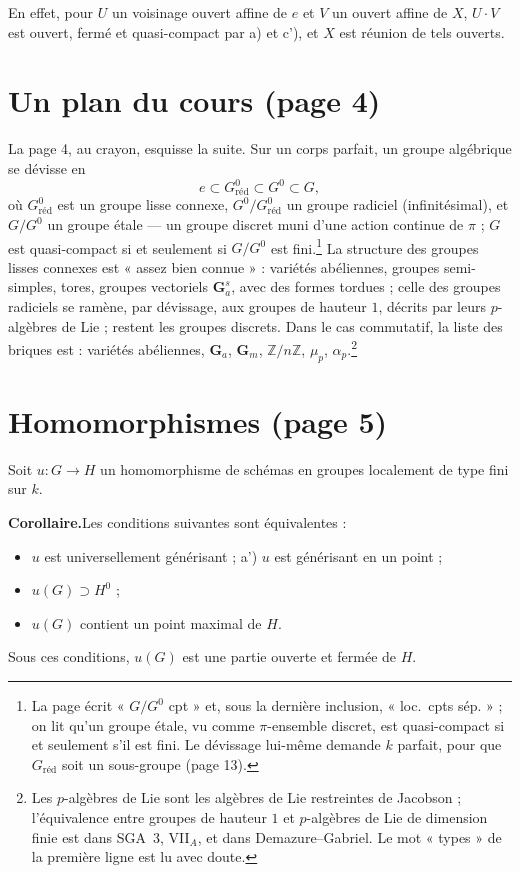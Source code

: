 \documentclass[11pt,a4paper]{article}
\begin{document}
En effet, pour $U$ un voisinage ouvert affine de $e$ et $V$ un ouvert affine
de $X$, $U \cdot V$ est ouvert, fermé et quasi-compact par a) et c'), et $X$
est réunion de tels ouverts.

\section*{Un plan du cours (page 4)}

La page 4, au crayon, esquisse la suite. Sur un corps parfait, un groupe
algébrique se dévisse en
\[
  e \subset G^{0}_{\mathrm{réd}} \subset G^{0} \subset G ,
\]
où $G^{0}_{\mathrm{réd}}$ est un groupe lisse connexe, $G^{0}/G^{0}_{\mathrm{réd}}$
un groupe radiciel (infinitésimal), et $G/G^{0}$ un groupe étale --- un
groupe discret muni d'une action continue de $\pi$ ; $G$ est quasi-compact
si et seulement si $G/G^{0}$ est fini.\footnote{La page écrit « $G/G^{0}$
cpt » et, sous la dernière inclusion, « loc.\ cpts sép. » ; on lit qu'un
groupe étale, vu comme $\pi$-ensemble discret, est quasi-compact si et
seulement s'il est fini. Le dévissage lui-même demande $k$ parfait, pour que
$G_{\mathrm{réd}}$ soit un sous-groupe (page 13).}
La structure des groupes lisses connexes est « assez bien connue » : variétés
abéliennes, groupes semi-simples, tores, groupes vectoriels
$\mathbf{G}_{a}^{s}$, avec des formes tordues ; celle des groupes radiciels
se ramène, par dévissage, aux groupes de hauteur $1$, décrits par leurs
$p$-algèbres de Lie ; restent les groupes discrets. Dans le cas commutatif,
la liste des briques est : variétés abéliennes, $\mathbf{G}_{a}$,
$\mathbf{G}_{m}$, $\mathbb{Z}/n\mathbb{Z}$, $\mu_{p}$,
$\alpha_{p}$.\footnote{Les $p$-algèbres de Lie sont les algèbres de Lie
restreintes de Jacobson ; l'équivalence entre groupes de hauteur $1$ et
$p$-algèbres de Lie de dimension finie est dans SGA~3, VII$_{A}$, et dans
Demazure--Gabriel. Le mot « types » de la première ligne est lu avec doute.}

\section*{Homomorphismes (page 5)}

Soit $u \colon G \to H$ un homomorphisme de schémas en groupes localement de
type fini sur $k$.

\textbf{Corollaire.}\quad Les conditions suivantes sont équivalentes :
\begin{itemize}
\item[a)] $u$ est universellement générisant ; a') $u$ est générisant en un
point ;
\item[b)] $u(G) \supset H^{0}$ ;
\item[c)] $u(G)$ contient un point maximal de $H$.
\end{itemize}
Sous ces conditions, $u(G)$ est une partie ouverte et fermée de $H$.
\end{document}
